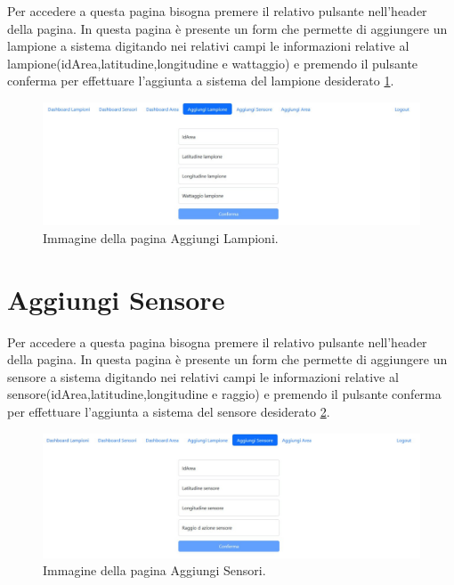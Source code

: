 Per accedere a questa pagina bisogna premere il relativo pulsante nell'header della pagina. In questa pagina è presente un form che permette di aggiungere un lampione a sistema digitando nei relativi campi le informazioni relative al lampione(idArea,latitudine,longitudine e wattaggio) e premendo il pulsante conferma per effettuare l'aggiunta a sistema del lampione desiderato \ref{fig:aggiunta_lamp}.

\begin{figure}[ht]
    \centering
    \includegraphics[width=\textwidth]{img/aggiunta_lamp.jpeg}
    \caption{Immagine della pagina Aggiungi Lampioni.}
    \label{fig:aggiunta_lamp}
\end{figure}

\section{Aggiungi Sensore}

Per accedere a questa pagina bisogna premere il relativo pulsante nell'header della pagina. In questa pagina è presente un form che permette di aggiungere un sensore a sistema digitando nei relativi campi le informazioni relative al sensore(idArea,latitudine,longitudine e raggio) e premendo il pulsante conferma per effettuare l'aggiunta a sistema del sensore desiderato \ref{fig:aggiunta_sens}.

\begin{figure}[ht]
    \centering
    \includegraphics[width=\textwidth]{img/aggiunta_sens.jpeg}
    \caption{Immagine della pagina Aggiungi Sensori.}
    \label{fig:aggiunta_sens}
\end{figure}

